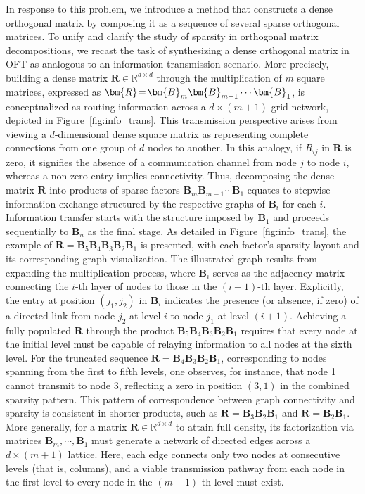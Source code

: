 In response to this problem, we introduce a method that constructs a dense orthogonal matrix by composing it as a sequence of several sparse orthogonal matrices. To unify and clarify the study of sparsity in orthogonal matrix decompositions, we recast the task of synthesizing a dense orthogonal matrix in OFT as analogous to an information transmission scenario. More precisely, building a dense matrix $\bm{R}\in\mathbb{R}^{d\times d}$ through the multiplication of $m$ square matrices, expressed as $\thickmuskip=2mu \medmuskip=2mu \bm{R}=\bm{B}_m\bm{B}_{m-1}\cdots\bm{B}_1$, is conceptualized as routing information across a $d\times (m+1)$ grid network, depicted in Figure~\ref{fig:info_trans}. This transmission perspective arises from viewing a $d$-dimensional dense square matrix as representing complete connections from one group of $d$ nodes to another. In this analogy, if $R_{ij}$ in $\bm{R}$ is zero, it signifies the absence of a communication channel from node $j$ to node $i$, whereas a non-zero entry implies connectivity. Thus, decomposing the dense matrix $\bm{R}$ into products of sparse factors $\bm{B}_m\bm{B}_{m-1}\cdots\bm{B}_1$ equates to stepwise information exchange structured by the respective graphs of $\bm{B}_i$ for each $i$. Information transfer starts with the structure imposed by $\bm{B}_1$ and proceeds sequentially to $\bm{B}_n$ as the final stage. As detailed in Figure~\ref{fig:info_trans}, the example of $\bm{R}=\bm{B}_5\bm{B}_4\bm{B}_3\bm{B}_2\bm{B}_1$ is presented, with each factor’s sparsity layout and its corresponding graph visualization. The illustrated graph results from expanding the multiplication process, where $\bm{B}_i$ serves as the adjacency matrix connecting the $i$-th layer of nodes to those in the $(i+1)$-th layer. Explicitly, the entry at position $(j_1,j_2)$ in $\bm{B}_i$ indicates the presence (or absence, if zero) of a directed link from node $j_2$ at level $i$ to node $j_1$ at level $(i+1)$. Achieving a fully populated $\bm{R}$ through the product $\bm{B}_5\bm{B}_4\bm{B}_3\bm{B}_2\bm{B}_1$ requires that every node at the initial level must be capable of relaying information to all nodes at the sixth level. For the truncated sequence $\bm{R}=\bm{B}_4\bm{B}_3\bm{B}_2\bm{B}_1$, corresponding to nodes spanning from the first to fifth levels, one observes, for instance, that node 1 cannot transmit to node 3, reflecting a zero in position $(3,1)$ in the combined sparsity pattern. This pattern of correspondence between graph connectivity and sparsity is consistent in shorter products, such as $\bm{R}=\bm{B}_3\bm{B}_2\bm{B}_1$ and $\bm{R}=\bm{B}_2\bm{B}_1$. More generally, for a matrix $\bm{R}\in\mathbb{R}^{d\times d}$ to attain full density, its factorization via matrices $\bm{B}_m,\cdots,\bm{B}_1$ must generate a network of directed edges across a $d\times (m+1)$ lattice. Here, each edge connects only two nodes at consecutive levels (that is, columns), and a viable transmission pathway from each node in the first level to every node in the $(m+1)$-th level must exist.


